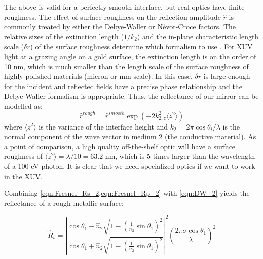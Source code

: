 %
%

The above is valid for a perfectly smooth interface, but real optics have finite roughness. The effect of surface roughness on the reflection amplitude $\hat{r}$ is commonly treated by either the Debye-Waller or N\'evot-Croce factors. The relative sizes of the extinction length ($1/k_2$) and the in-plane characteristic length scale ($\delta r$) of the surface roughness determine which formalism to use \cite{sentenacStatisticalAspectsWave2009, gibaudSpecularReflectivitySmooth2009}. For XUV light at a grazing angle on a gold surface, the extinction length is on the order of 10 nm, which is much smaller than the length scale of the surface roughness of highly polished materials (micron or mm scale). In this case, $\delta r$ is large enough for the incident and reflected fields have a precise phase relationship and the Debye-Waller formalism is appropriate. Thus, the reflectance of our mirror can be modelled as:
\begin{equation}
\hat{r}^{rough} = \hat{r}^{smooth} \exp \left( -2 k_{2,z}^2 \langle z^2 \rangle \right)
\label{eqn:DW_2}
\end{equation}
where $ \langle z^2 \rangle$ is the variance of the interface height and $k_2 = 2 \pi \cos \theta_i / \lambda$ is the normal component of the wave vector in medium 2 (the conductive material). As a point of comparison, a high quality off-the-shelf optic will have a surface roughness of $\langle z^2 \rangle = \lambda/10 = 63.2 \text{ nm}$, which is 5 times larger than the wavelength of a 100 eV photon. It is clear that we need specialized optics if we want to work in the XUV.

Combining \cref{eqn:Fresnel_Rs_2,eqn:Fresnel_Rp_2} with \cref{eqn:DW_2} yields the reflectance of a rough metallic surface:

\begin{equation}
\hat{R}_s = \left| \frac{\cos \theta_1 - \hat{n}_2 \sqrt{1-\left(\frac{1}{n_2}\sin \theta_1\right)^2}}{\cos \theta_1 + \hat{n}_2 \sqrt{1-\left(\frac{1}{n_2}\sin \theta_1\right)^2}} \right|^2 \left( \frac{2 \pi \sigma \cos \theta_1}{\lambda} \right)^2
\label{eqn:Fresnel_Rs_3}
\end{equation}

